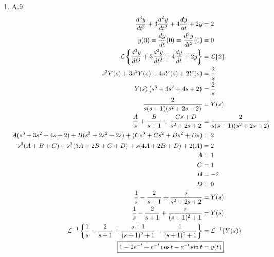 \documentclass[12pt]{article}
\begin{document}
\begin{enumerate}
\newpage
    \item A.9
    \begin{align*}
        \frac{d^3y}{dt^3} + 3 \frac{d^2y}{dt^2} + 4 \frac{dy}{dt} + 2y &= 2 \\
        y(0) = \frac{dy}{dt}(0) = \frac{d^2y}{dt^2}(0) &= 0 \\ 
        \mathcal{L}\left\{\frac{d^3y}{dt^3} + 3 \frac{d^2y}{dt^2} + 4 \frac{dy}{dt} + 2y \right\} &= \mathcal{L}\{2\} \\
        s^3 Y(s) + 3s^2 Y(s) + 4s Y(s) + 2Y(s) &= \frac{2}{s} \\
        Y(s) \left( s^3 + 3s^2 + 4s + 2 \right) &= \frac{2}{s} \\
        \frac{2}{s (s + 1) (s^2 + 2s + 2)} &= Y(s) \\
        \frac{A}{s} + \frac{B}{s+1} + \frac{Cs + D}{s^2 + 2s + 2} &= \frac{2}{s (s + 1) (s^2 + 2s + 2)} \\
        A (s^3 + 3s^2 + 4s + 2) + B (s^3 + 2s^2 + 2s) + (Cs^3 + Cs^2 + Ds^2 + Ds) &= 2 \\
        s^3 (A + B + C) + s^2 (3A + 2B + C + D) + s (4A + 2B + D) + 2 (A) &= 2 \\
        A &= 1 \\
        C &= 1 \\
        B &= -2 \\
        D &= 0 \\
        \frac{1}{s} - \frac{2}{s+1} + \frac{s}{s^2 + 2s + 2} &= Y(s) \\
        \frac{1}{s} - \frac{2}{s+1} + \frac{s}{(s + 1)^2 + 1} &= Y(s) \\
        \mathcal{L}^{-1}\left\{\frac{1}{s} - \frac{2}{s+1} + \frac{s + 1}{(s + 1)^2 + 1} - \frac{1}{(s + 1)^2 + 1}\right\} &= \mathcal{L}^{-1}\{Y(s)\} \\
        \Aboxed{1 - 2 e^{-t} + e^{-t} \cos{t} - e^{-t} \sin{t} &= y(t)}
    \end{align*}



\end{enumerate}
\end{document}
